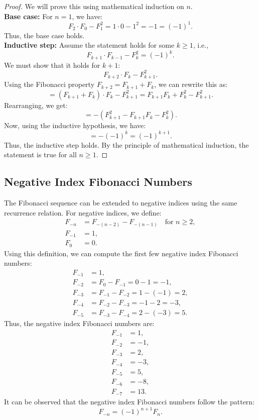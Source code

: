 \documentclass[openany]{book}
\begin{document}
\begin{proof}
    We will prove this using mathematical induction on $n$. \\
    \textbf{Base case:} For $n = 1$, we have:
    \[
        F_{2} \cdot F_{0} - F_1^2 = 1 \cdot 0 - 1^2 = -1 = (-1)^1.
    \]
    Thus, the base case holds. \\ 
    \textbf{Inductive step:} Assume the statement holds for some $k \geq 1$, i.e.,
    \[
        F_{k+1} \cdot F_{k-1} - F_k^2 = (-1)^k.
    \]
    We must show that it holds for $k + 1$:
    \[
        F_{k+2} \cdot F_k - F_{k+1}^2.
    \]
    Using the Fibonacci property $F_{k+2} = F_{k+1} + F_k$, we can rewrite this as:
    \[
        = (F_{k+1} + F_k) \cdot F_k - F_{k+1}^2 = F_{k+1}F_k + F_k^2 - F_{k+1}^2.
    \]
    Rearranging, we get:
    \[
        = - (F_{k+1}^2 - F_{k+1}F_k - F_k^2).
    \]
    Now, using the inductive hypothesis, we have:
    \[
        = -(-1)^k = (-1)^{k+1}.
    \]
    Thus, the inductive step holds.
    By the principle of mathematical induction, the statement is true for all $n \geq 1$.
\end{proof}
\subsection{Negative Index Fibonacci Numbers}
The Fibonacci sequence can be extended to negative indices using the same recurrence relation. For negative indices, we define:
\begin{align*}
    F_{-n} &= F_{-(n-2)} - F_{-(n-1)} \quad \text{for } n \geq 2, \\
    F_{-1} &= 1, \\
    F_{0} &= 0.
\end{align*}
Using this definition, we can compute the first few negative index Fibonacci numbers:
\begin{align*}
    F_{-1} &= 1, \\
    F_{-2} &= F_0 - F_{-1} = 0 - 1 = -1, \\
    F_{-3} &= F_{-1} - F_{-2} = 1 - (-1) = 2, \\
    F_{-4} &= F_{-2} - F_{-3} = -1 - 2 = -3, \\
    F_{-5} &= F_{-3} - F_{-4} = 2 - (-3) = 5.
\end{align*}
Thus, the negative index Fibonacci numbers are:
\begin{align*}
    F_{-1} &= 1, \\
    F_{-2} &= -1, \\
    F_{-3} &= 2, \\
    F_{-4} &= -3, \\
    F_{-5} &= 5, \\
    F_{-6} &= -8, \\
    F_{-7} &= 13.
\end{align*}
It can be observed that the negative index Fibonacci numbers follow the pattern:
\[
    F_{-n} = (-1)^{n+1} F_n.
\]
\end{document}
